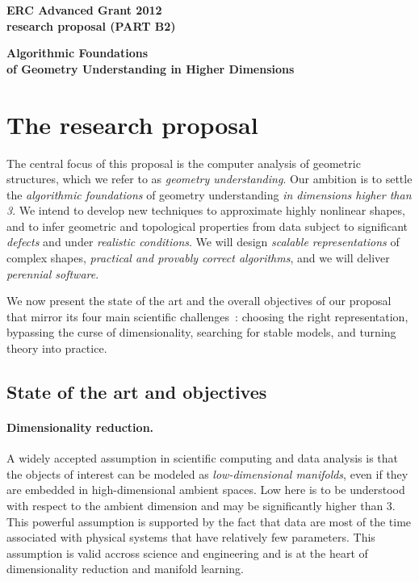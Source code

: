 \thispagestyle{empty}

\mbox{}\vspace{-3.5cm}

\begin{center}
{\Large
{\bf ERC Advanced Grant 2012 \\ research proposal (PART B2)}}
\vspace{1cm}

{\LARGE {\bf  Algorithmic Foundations \\ of 
Geometry Understanding in Higher Dimensions}

\vspace{3mm} 

}
\end{center}
\section{The research proposal}

The central focus of this  proposal is  the computer analysis of geometric structures, which we refer to as {\em geometry understanding}. Our ambition is to settle the {\em algorithmic foundations} of geometry understanding  {\em in dimensions higher than 3}. We intend to develop new techniques to approximate highly nonlinear shapes, and to infer geometric and topological properties from data subject to significant {\em defects} and under {\em realistic conditions}. 
We will design {\em scalable representations} of complex shapes,  {\em practical and provably correct algorithms}, and we will deliver {\em perennial software}.

We now present the state of the art and the overall objectives of our proposal that mirror its four main scientific challenges~: choosing the right representation, bypassing the curse of dimensionality, searching for stable models, and turning theory into practice.


\subsection{State of the art and objectives}

\paragraph{Dimensionality reduction.} A widely accepted assumption in scientific computing and data analysis is that the objects of interest can be modeled as {\em low-dimensional manifolds}, even if they are embedded in high-dimensional ambient spaces. Low here is to be understood with respect to the ambient dimension and may be significantly higher than 3. This powerful assumption is supported by the fact that data are most of the time associated with physical systems that have relatively few parameters.  This assumption is valid accross science and engineering and is at the heart of dimensionality reduction and manifold learning.

